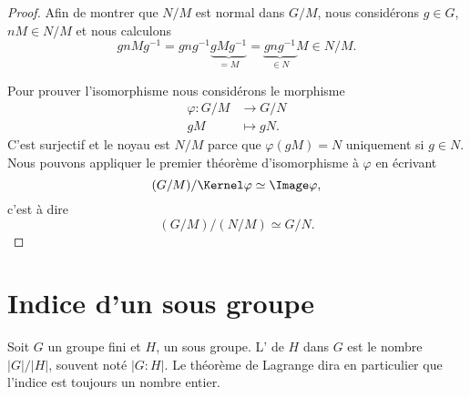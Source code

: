 \begin{proof}
    Afin de montrer que \( N/M\) est normal dans \( G/M\), nous considérons \( g\in G\), \( nM\in N/M\) et nous calculons
    \begin{equation}
        gnMg^{-1}=gng^{-1}\underbrace{gMg^{-1}}_{=M}=\underbrace{gng^{-1}}_{\in N}M\in N/M.
    \end{equation}

    Pour prouver l'isomorphisme nous considérons le morphisme
    \begin{equation}
        \begin{aligned}
            \varphi\colon G/M&\to G/N \\
            gM&\mapsto gN. 
        \end{aligned}
    \end{equation}
    C'est surjectif et le noyau est \( N/M\) parce que \( \varphi(gM)=N\) uniquement si \( g\in N\). Nous pouvons appliquer le premier théorème d'isomorphisme à \( \varphi\) en écrivant
    \begin{equation}
        (G/M)/\Kernel \varphi\simeq\Image \varphi,
    \end{equation}
    c'est à dire
    \begin{equation}
        (G/M)/(N/M)\simeq G/N.
    \end{equation}
\end{proof}

\section{Indice d'un sous groupe}

Soit \( G\) un groupe fini et \( H\), un sous groupe. L' de \( H\) dans \( G\) est le nombre \( | G |/| H |\), souvent noté \( | G:H |\). Le théorème de Lagrange dira en particulier que l'indice est toujours un nombre entier.

